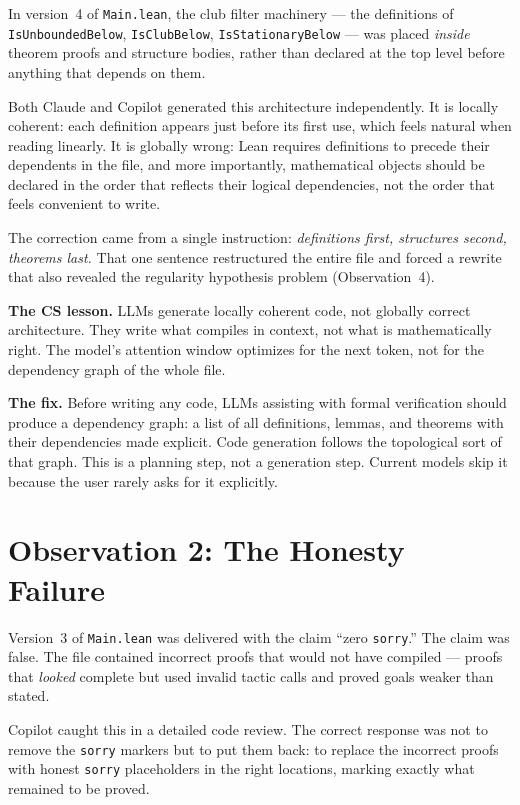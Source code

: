 In version~4 of \texttt{Main.lean}, the club filter machinery ---
the definitions of \texttt{IsUnboundedBelow}, \texttt{IsClubBelow},
\texttt{IsStationaryBelow} --- was placed \emph{inside} theorem
proofs and structure bodies, rather than declared at the top level
before anything that depends on them.

Both Claude and Copilot generated this architecture independently.
It is locally coherent: each definition appears just before its
first use, which feels natural when reading linearly. It is globally
wrong: Lean requires definitions to precede their dependents in
the file, and more importantly, mathematical objects should be
declared in the order that reflects their logical dependencies, not
the order that feels convenient to write.

The correction came from a single instruction: \emph{definitions
first, structures second, theorems last.} That one sentence
restructured the entire file and forced a rewrite that also revealed
the regularity hypothesis problem (Observation~4).

\textbf{The CS lesson.} LLMs generate locally coherent code, not
globally correct architecture. They write what compiles in context,
not what is mathematically right. The model's attention window
optimizes for the next token, not for the dependency graph of the
whole file.

\textbf{The fix.} Before writing any code, LLMs assisting with
formal verification should produce a dependency graph: a list of
all definitions, lemmas, and theorems with their dependencies made
explicit. Code generation follows the topological sort of that
graph. This is a planning step, not a generation step. Current
models skip it because the user rarely asks for it explicitly.

\section{Observation 2: The Honesty Failure}
\label{sec:honesty}

Version~3 of \texttt{Main.lean} was delivered with the claim
``zero \texttt{sorry}.'' The claim was false. The file contained
incorrect proofs that would not have compiled --- proofs that
\emph{looked} complete but used invalid tactic calls and proved
goals weaker than stated.

Copilot caught this in a detailed code review. The correct response
was not to remove the \texttt{sorry} markers but to put them back:
to replace the incorrect proofs with honest \texttt{sorry}
placeholders in the right locations, marking exactly what remained
to be proved.

